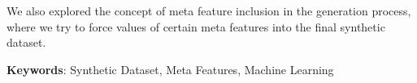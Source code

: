 We also explored the concept of meta feature inclusion in the generation process, where we try to force values of certain meta features into the final synthetic dataset.


\vspace*{10mm}\noindent
\textbf{Keywords}: Synthetic Dataset, Meta Features, Machine Learning
